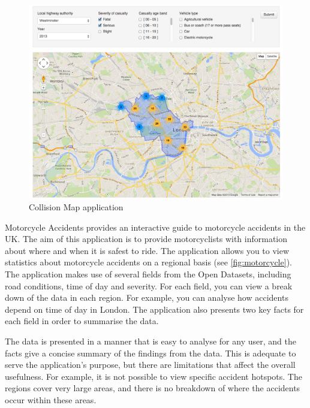 \documentclass[authoryearcitations]{UoYCSproject}
\begin{document}
\begin{figure}
	\center
	\includegraphics[scale=0.3]{collisionmap}
	\caption{Collision Map application}
	\label{fig:collisionmap}
\end{figure}

Motorcycle Accidents \citep{Mceinsurance} provides an interactive guide to motorcycle accidents in the UK. The aim of this application is to provide motorcyclists with information about where and when it is safest to ride. The application allows you to view statistics about motorcycle accidents on a regional basis (see \autoref{fig:motorcycle}). The application makes use of several fields from the Open Datasets, including road conditions, time of day and severity. For each field, you can view a break down of the data in each region. For example, you can analyse how accidents depend on time of day in London. The application also presents two key facts for each field in order to summarise the data.

The data is presented in a manner that is easy to analyse for any user, and the facts give a concise summary of the findings from the data. This is adequate to serve the application's purpose, but there are limitations that affect the overall usefulness. For example, it is not possible to view specific accident hotspots. The regions cover very large areas, and there is no breakdown of where the accidents occur within these areas.
\end{document}
